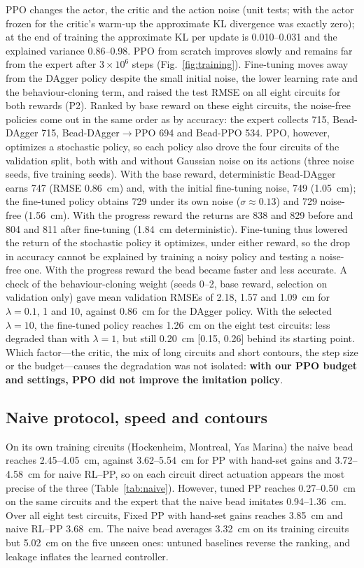 \documentclass[10pt,twocolumn,twoside]{article}
\newcommand{\dpo}{DAgger$\to$PPO}
\begin{document}
PPO changes the actor, the critic and the action noise (unit tests; with the
actor frozen for the critic's warm-up the approximate KL divergence was exactly
zero); at the end of training the approximate KL per update is 0.010--0.031 and
the explained variance 0.86--0.98. PPO from scratch improves slowly and remains far
from the expert after $3\times10^{6}$ steps (Fig.~\ref{fig:training}).
Fine-tuning moves away from the DAgger policy despite the small initial noise,
the lower learning rate and the behaviour-cloning term, and raised the test RMSE
on all eight circuits for both rewards (P2). Ranked by base reward on these eight
circuits, the noise-free policies come out in the same order as by accuracy: the
expert collects 715, Bead-DAgger 715, Bead-\dpo{} 694 and Bead-PPO 534. PPO,
however, optimizes a stochastic policy, so each policy also drove the four
circuits of the validation split, both with and without Gaussian noise on its
actions (three
noise seeds, five training seeds). With the base reward, deterministic
Bead-DAgger earns 747 (RMSE 0.86~cm) and, with the initial fine-tuning noise,
749 (1.05~cm); the fine-tuned policy obtains 729 under its own noise
($\sigma\approx0.13$) and 729 noise-free (1.56~cm). With the progress reward the
returns are 838 and 829 before and 804 and 811 after fine-tuning (1.84~cm
deterministic). Fine-tuning thus lowered the return of the stochastic policy it
optimizes, under either reward, so the drop in accuracy cannot be explained by
training a noisy policy and testing a noise-free one. With the progress reward
the bead became faster and less accurate. A check of the behaviour-cloning
weight (seeds 0--2, base reward, selection on validation only) gave mean
validation RMSEs of 2.18, 1.57 and 1.09~cm for $\lambda=0.1$, 1 and 10, against
0.86~cm for the DAgger policy. With the selected $\lambda=10$, the fine-tuned
policy reaches 1.26~cm on the eight test circuits: less degraded than with
$\lambda=1$, but still 0.20~cm [0.15, 0.26] behind its starting point. Which
factor---the critic, the mix of long circuits and short
contours, the step size or the budget---causes the degradation was not isolated:
\textbf{with our PPO budget and settings, PPO did not improve the imitation
policy}.

\subsection{Naive protocol, speed and contours}

On its own training circuits (Hockenheim, Montreal, Yas Marina) the naive bead
reaches 2.45--4.05~cm, against 3.62--5.54~cm for PP with hand-set gains and
3.72--4.58~cm for naive RL--PP, so on each circuit direct actuation appears the
most precise of the three (Table~\ref{tab:naive}). However, tuned PP reaches 0.27--0.50~cm on the same circuits and the
expert that the naive bead imitates 0.94--1.36~cm. Over all eight test circuits,
Fixed PP with hand-set gains reaches 3.85~cm and naive RL--PP 3.68~cm. The naive bead averages 3.32~cm on
its training circuits but 5.02~cm on the five unseen ones: untuned baselines
reverse the ranking, and leakage inflates the learned controller.
\end{document}
